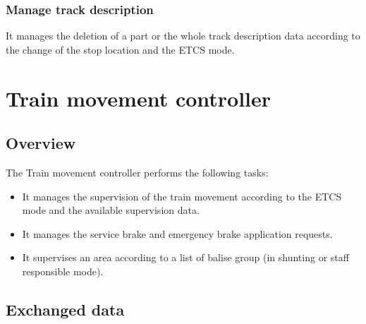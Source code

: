 \documentclass[nocc]{template/openetcs_report}
\begin{document}
\subsection{Manage track description}
It manages the deletion of a part or the whole track description data according to the change of the stop location and the ETCS mode.

\chapter{Train movement controller}
\section{Overview}
The Train movement controller performs the following tasks:
\begin{itemize}
\item	It manages the supervision of the train movement according to the ETCS mode and the available supervision data.
\item	It manages the service brake and emergency brake application requests.
\item	It supervises an area according to a list of balise group (in shunting or staff responsible mode).
\end{itemize}
\section{Exchanged data}
\end{document}
